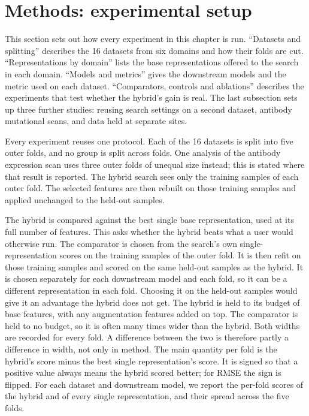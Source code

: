 \section{Methods: experimental setup}
This section sets out how every experiment in this chapter is run. ``Datasets and splitting'' describes the 16 datasets from six domains and how their folds are cut. ``Representations by domain'' lists the base representations offered to the search in each domain. ``Models and metrics'' gives the downstream models and the metric used on each dataset. ``Comparators, controls and ablations'' describes the experiments that test whether the hybrid's gain is real. The last subsection sets up three further studies: reusing search settings on a second dataset, antibody mutational scans, and data held at separate sites.

Every experiment reuses one protocol. Each of the 16 datasets is split into five outer folds, and no group is split across folds. One analysis of the antibody expression scan uses three outer folds of unequal size instead; this is stated where that result is reported. The hybrid search sees only the training samples of each outer fold. The selected features are then rebuilt on those training samples and applied unchanged to the held-out samples.

The hybrid is compared against the best single base representation, used at its full number of features. This asks whether the hybrid beats what a user would otherwise run. The comparator is chosen from the search's own single-representation scores on the training samples of the outer fold. It is then refit on those training samples and scored on the same held-out samples as the hybrid. It is chosen separately for each downstream model and each fold, so it can be a different representation in each fold. Choosing it on the held-out samples would give it an advantage the hybrid does not get. The hybrid is held to its budget of base features, with any augmentation features added on top. The comparator is held to no budget, so it is often many times wider than the hybrid. Both widths are recorded for every fold. A difference between the two is therefore partly a difference in width, not only in method. The main quantity per fold is the hybrid's score minus the best single representation's score. It is signed so that a positive value always means the hybrid scored better; for RMSE the sign is flipped. For each dataset and downstream model, we report the per-fold scores of the hybrid and of every single representation, and their spread across the five folds.

